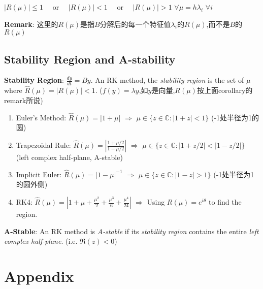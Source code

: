 \documentclass[9pt]{article}
\begin{document}
\quad $|R(\mu)|\leq1$ \ \ or \ \ $|R(\mu)|<1$ \ \ or \ \ $|R(\mu)|>1$ \quad $\forall \mu=h\lambda_i$ $\forall i$ 

\quad \textbf{Remark}: 这里的$R(\mu)$是指$B$分解后的每一个特征值$\lambda_i$的$R(\mu)$,而不是$B$的$R(\mu)$


\subsection{Stability Region and A-stability} %

\textbf{Stability Region}: {\small $\frac{dy}{dt}=By$. An RK method, the \textit{stability region} is the set of $\mu$ where $\widehat{R}(\mu)=|R(\mu)|<1$.} {\tiny ($f(y)=\lambda y$,如$y$是向量,$R(\mu)$按上面corollary的remark所说)} 

\begin{enumerate}[itemsep=-2pt, topsep=-2pt]
    \item Euler's Method: $\widehat{R}(\mu)=|1+\mu|$ \quad $\Rightarrow$ \quad $\mu\in\{z\in\mathbb{C}:|1+z|<1\}$ {\scriptsize (-1处半径为1的圆)}
    \item Trapezoidal Rule: $\widehat{R}(\mu)=\left|\frac{1+\mu/2}{1-\mu/2}\right|$ \quad $\Rightarrow$ \quad $\mu\in\{z\in\mathbb{C}:|1+z/2|<|1-z/2|\}$ {\scriptsize (left complex half-plane, A-stable)}
    \item Implicit Euler: $\widehat{R}(\mu)=|1-\mu|^{-1}$ \quad $\Rightarrow$ \quad $\mu\in\{z\in\mathbb{C}:|1-z|>1\}$ {\scriptsize (-1处半径为1的圆外侧)}
    \item RK4: $\widehat{R}(\mu)=\left|1+\mu+\frac{\mu^2}{2}+\frac{\mu^3}{6}+\frac{\mu^4}{24}\right|$ \quad $\Rightarrow$ \quad Using $R(\mu)=e^{i\theta}$ to find the region.
\end{enumerate}

\textbf{A-Stable}: An RK method is \textit{A-stable} if its \textit{stability region} contains the entire \textit{left complex half-plane}. {\scriptsize (i.e. $\Re(z)<0$)}


\section{}


\section{Appendix} 
\end{document}
